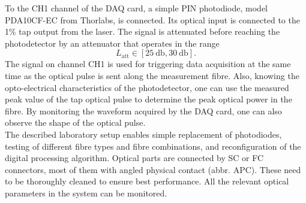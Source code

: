 \documentclass{standalone}
\begin{document}
To the CH1 channel of the DAQ card, a simple PIN photodiode, model PDA10CF-EC from Thorlabs, is connected. Its optical input is connected to the 1\% tap output from the laser. The signal is attenuated before reaching the photodetector by an attenuator that operates in the range
\begin{equation}
L_\textrm{att} \in [\SI{25}{\decibel}, \SI{30}{\decibel}] \textrm{.}
\end{equation}
The signal on channel CH1 is used for triggering data acquisition at the same time as the optical pulse is sent along the measurement fibre. Also, knowing the opto-electrical characteristics of the photodetector, one can use the measured peak value of the tap optical pulse to determine the peak optical power in the fibre. By monitoring the waveform acquired by the DAQ card, one can also observe the shape of the optical pulse. \\

The described laboratory setup enables simple replacement of photodiodes, testing of different fibre types and fibre combinations, and reconfiguration of the digital processing algorithm. Optical parts are connected by SC or FC connectors, most of them with angled physical contact (abbr. APC). These need to be thoroughly cleaned to ensure best performance. All the relevant optical parameters in the system can be monitored. 


\setcounter{stranica}{\thepage}
\addtocounter{stranica}{1}
\end{document}
